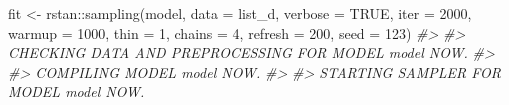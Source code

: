 \documentclass[
]{article}
\newenvironment{Shaded}{\begin{snugshade}}{\end{snugshade}}
\newcommand{\AttributeTok}[1]{\textcolor[rgb]{0.77,0.63,0.00}{#1}}
\newcommand{\CommentTok}[1]{\textcolor[rgb]{0.56,0.35,0.01}{\textit{#1}}}
\newcommand{\ConstantTok}[1]{\textcolor[rgb]{0.00,0.00,0.00}{#1}}
\newcommand{\DecValTok}[1]{\textcolor[rgb]{0.00,0.00,0.81}{#1}}
\newcommand{\FunctionTok}[1]{\textcolor[rgb]{0.00,0.00,0.00}{#1}}
\newcommand{\NormalTok}[1]{#1}
\newcommand{\OtherTok}[1]{\textcolor[rgb]{0.56,0.35,0.01}{#1}}
\newcommand{\SpecialCharTok}[1]{\textcolor[rgb]{0.00,0.00,0.00}{#1}}
\begin{document}
\begin{Shaded}
\begin{Highlighting}[]
\NormalTok{fit }\OtherTok{\textless{}{-}}\NormalTok{ rstan}\SpecialCharTok{::}\FunctionTok{sampling}\NormalTok{(model,}
            \AttributeTok{data =}\NormalTok{ list\_d,}
            \AttributeTok{verbose =} \ConstantTok{TRUE}\NormalTok{,}
            \AttributeTok{iter =} \DecValTok{2000}\NormalTok{,}
            \AttributeTok{warmup =} \DecValTok{1000}\NormalTok{,}
            \AttributeTok{thin =} \DecValTok{1}\NormalTok{,}
            \AttributeTok{chains =} \DecValTok{4}\NormalTok{,}
            \AttributeTok{refresh =} \DecValTok{200}\NormalTok{,}
            \AttributeTok{seed =} \DecValTok{123}\NormalTok{)}
\CommentTok{\#\textgreater{} }
\CommentTok{\#\textgreater{} CHECKING DATA AND PREPROCESSING FOR MODEL \textquotesingle{}model\textquotesingle{} NOW.}
\CommentTok{\#\textgreater{} }
\CommentTok{\#\textgreater{} COMPILING MODEL \textquotesingle{}model\textquotesingle{} NOW.}
\CommentTok{\#\textgreater{} }
\CommentTok{\#\textgreater{} STARTING SAMPLER FOR MODEL \textquotesingle{}model\textquotesingle{} NOW.}
\end{Highlighting}
\end{Shaded}
\end{document}

